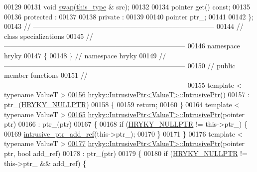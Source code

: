 \begin{DoxyCode}
00129 
00131     \textcolor{keywordtype}{void} \hyperlink{classhryky_1_1_intrusive_ptr_ab60b6a55a688776b82510c08c614709c}{swap}(\hyperlink{classhryky_1_1_intrusive_ptr}{this_type} & src);
00132 
00134     pointer \textcolor{keyword}{get}() \textcolor{keyword}{const};
00135 
00136 \textcolor{keyword}{protected} :
00137 
00138 \textcolor{keyword}{private} :
00139 
00140     pointer     ptr\_;
00141 
00142 \};
00143 \textcolor{comment}{//
      ------------------------------------------------------------------------------}
00144 \textcolor{comment}{// class specializations}
00145 \textcolor{comment}{//
      ------------------------------------------------------------------------------}
00146 \textcolor{keyword}{namespace }hryky
00147 \{
00148 \} \textcolor{comment}{// namespace hryky}
00149 \textcolor{comment}{//
      ------------------------------------------------------------------------------}
00150 \textcolor{comment}{// public member functions}
00151 \textcolor{comment}{//
      ------------------------------------------------------------------------------}
00155 \textcolor{comment}{}\textcolor{keyword}{template} < \textcolor{keyword}{typename} ValueT >
\hypertarget{intrusive__ptr_8h_source_l00156}{}\hyperlink{classhryky_1_1_intrusive_ptr_a8294a613bfbc752216fd26fe77d4aaf9}{00156} \hyperlink{classhryky_1_1_intrusive_ptr_a8294a613bfbc752216fd26fe77d4aaf9}{hryky::IntrusivePtr<ValueT>::IntrusivePtr}()
00157     : ptr\_(\hyperlink{common_8h_a4cd4ac09cfcdbd6b30ee69afc156e210}{HRYKY_NULLPTR})
00158 \{
00159     \textcolor{keywordflow}{return};
00160 \}
00164 \textcolor{keyword}{template} < \textcolor{keyword}{typename} ValueT >
\hypertarget{intrusive__ptr_8h_source_l00165}{}\hyperlink{classhryky_1_1_intrusive_ptr_a4e4600e5ff84aa875f1479c4a364583f}{00165} \hyperlink{classhryky_1_1_intrusive_ptr}{hryky::IntrusivePtr<ValueT>::IntrusivePtr}(pointer ptr)
00166     : ptr\_(ptr)
00167 \{
00168     \textcolor{keywordflow}{if} (\hyperlink{common_8h_a4cd4ac09cfcdbd6b30ee69afc156e210}{HRYKY_NULLPTR} != this->ptr\_) \{
00169         \hyperlink{namespacehryky_1_1reduction_ab59dece4af8e91c10781e3b092c06d1b}{intrusive_ptr_add_ref}(this->ptr\_);
00170     \}
00171 \}
00176 \textcolor{keyword}{template} < \textcolor{keyword}{typename} ValueT >
\hypertarget{intrusive__ptr_8h_source_l00177}{}\hyperlink{classhryky_1_1_intrusive_ptr_a55a0a47960f5a8f033c2794e25b91548}{00177} \hyperlink{classhryky_1_1_intrusive_ptr}{hryky::IntrusivePtr<ValueT>::IntrusivePtr}(pointer ptr, \textcolor{keywordtype}{bool} add\_ref)
00178     : ptr\_(ptr)
00179 \{
00180     \textcolor{keywordflow}{if} (\hyperlink{common_8h_a4cd4ac09cfcdbd6b30ee69afc156e210}{HRYKY_NULLPTR} != this->ptr\_ && add\_ref) \{

\end{DoxyCode}
